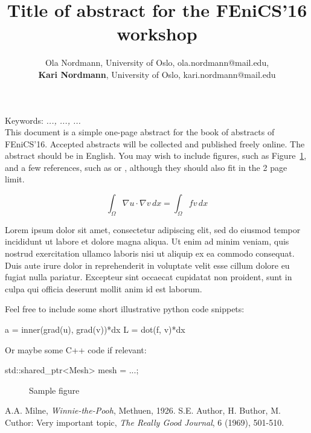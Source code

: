 \documentclass[11pt,a4paper]{article}
\begin{document}
\thispagestyle{empty}

\title{Title of abstract for the FEniCS'16 workshop}

\author{Ola Nordmann, University of Oslo, ola.nordmann@mail.edu, \\
\textbf{Kari Nordmann}, University of Oslo, kari.nordmann@mail.edu}

\date{} %
\maketitle\thispagestyle{empty}

Keywords: \emph{..., ..., ...}\\


This document is a simple one-page abstract for the book of abstracts
of FEniCS'16. Accepted abstracts will be collected and published
freely online.
The abstract should be in English. You may wish to include figures,
such as Figure~\ref{fig5}, and a few references, such as \cite{pu} or
\cite{model}, although they should also fit in the 2 page limit.

\begin{equation}
  \int_\Omega \nabla u \cdot \nabla v\, dx = \int_\Omega f v\, dx
\end{equation}

Lorem ipsum dolor sit amet, consectetur adipiscing elit, sed do
eiusmod tempor incididunt ut labore et dolore magna aliqua. Ut enim ad
minim veniam, quis nostrud exercitation ullamco laboris nisi ut
aliquip ex ea commodo consequat. Duis aute irure dolor in
reprehenderit in voluptate velit esse cillum dolore eu fugiat nulla
pariatur. Excepteur sint occaecat cupidatat non proident, sunt in
culpa qui officia deserunt mollit anim id est laborum.

Feel free to include some short illustrative python code snippets:
\begin{python}
a = inner(grad(u), grad(v))*dx
L = dot(f, v)*dx
\end{python}

Or maybe some C++ code if relevant:
\begin{c++}
std::shared_ptr<Mesh> mesh = ...;
\end{c++}

\begin{figure}[h]
\centerline{}
\caption{Sample figure}
\label{fig5}
\end{figure}

\begin{thebibliography}{00}
 A.A. Milne, \textit{Winnie-the-Pooh}, Methuen, 1926.
 S.E. Author, H. Buthor, M. Cuthor: Very important topic, 
\textit{The Really Good Journal}, 6 (1969), 501-510.
\end{thebibliography}
\end{document}

